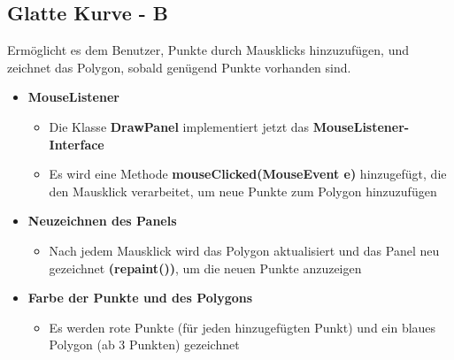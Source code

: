 \begin{codeblock}
    
\end{codeblock}

\subsection*{Glatte Kurve - B}
Ermöglicht es dem Benutzer, Punkte durch Mausklicks hinzuzufügen, und zeichnet das Polygon, sobald genügend Punkte vorhanden sind.
\begin{itemize}[itemsep=0pt]
   \item \textbf{MouseListener}
   \begin{itemize}
    \item Die Klasse \textbf{DrawPanel} implementiert jetzt das \textbf{MouseListener-Interface}
    \item Es wird eine Methode \textbf{mouseClicked(MouseEvent e)} hinzugefügt, die den Mausklick verarbeitet, um neue Punkte zum Polygon hinzuzufügen
   \end{itemize}
   \item \textbf{Neuzeichnen des Panels} 
   \begin{itemize}
    \item Nach jedem Mausklick wird das Polygon aktualisiert und das Panel neu gezeichnet \textbf{(repaint())}, um die neuen Punkte anzuzeigen
   \end{itemize}
   \item \textbf{Farbe der Punkte und des Polygons}
   \begin{itemize}
    \item Es werden rote Punkte (für jeden hinzugefügten Punkt) und ein blaues Polygon (ab 3 Punkten) gezeichnet
   \end{itemize}
\end{itemize}
\begin{codeblock}
    
\end{codeblock}

